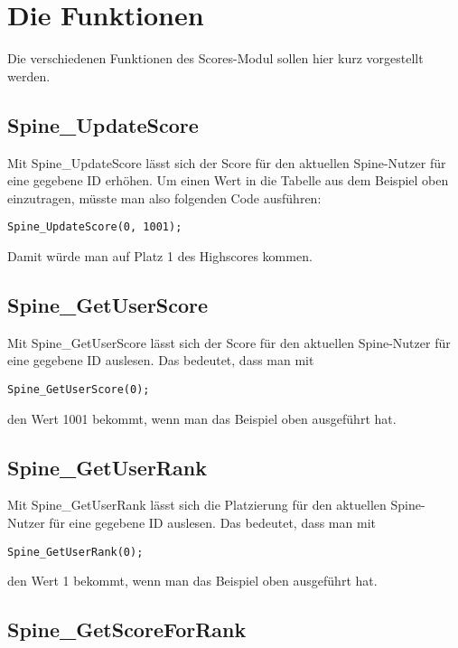 \documentclass{article}
\begin{document}
\section{Die Funktionen}

Die verschiedenen Funktionen des Scores-Modul sollen hier kurz vorgestellt werden.

\subsection{Spine\_UpdateScore}

Mit Spine\_UpdateScore lässt sich der Score für den aktuellen Spine-Nutzer für eine gegebene ID erhöhen. Um einen Wert in die Tabelle aus dem Beispiel oben einzutragen, müsste man also folgenden Code ausführen:

\begin{lstlisting}
Spine_UpdateScore(0, 1001);
\end{lstlisting}

Damit würde man auf Platz 1 des Highscores kommen.

\subsection{Spine\_GetUserScore}

Mit Spine\_GetUserScore lässt sich der Score für den aktuellen Spine-Nutzer für eine gegebene ID auslesen. Das bedeutet, dass man mit

\begin{lstlisting}
Spine_GetUserScore(0);
\end{lstlisting}

den Wert 1001 bekommt, wenn man das Beispiel oben ausgeführt hat.

\subsection{Spine\_GetUserRank}

Mit Spine\_GetUserRank lässt sich die Platzierung für den aktuellen Spine-Nutzer für eine gegebene ID auslesen. Das bedeutet, dass man mit

\begin{lstlisting}
Spine_GetUserRank(0);
\end{lstlisting}

den Wert 1 bekommt, wenn man das Beispiel oben ausgeführt hat.

\subsection{Spine\_GetScoreForRank}
\end{document}
